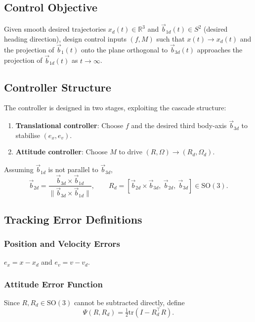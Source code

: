 \documentclass[11pt]{article}
\theoremstyle{remark}
\newcommand{\SO}{\mathrm{SO}(3)}
\newcommand{\R}{\mathbb{R}}
\newcommand{\tr}{\mathrm{tr}}
\begin{document}
\subsection{Control Objective}
Given smooth desired trajectories $x_d(t) \in \R^3$ and $\vec{b}_{1d}(t) \in S^2$ (desired heading direction), design control inputs $(f, M)$ such that $x(t) \to x_d(t)$ and the projection of $\vec{b}_1(t)$ onto the plane orthogonal to $\vec{b}_{3d}(t)$ approaches the projection of $\vec{b}_{1d}(t)$ as $t \to \infty$.

\subsection{Controller Structure}
The controller is designed in two stages, exploiting the cascade structure:
\begin{enumerate}
    \item \textbf{Translational controller}: Choose $f$ and the desired third body-axis $\vec{b}_{3d}$ to stabilise $(e_x, e_v)$.
    \item \textbf{Attitude controller}: Choose $M$ to drive $(R, \Omega) \to (R_d, \Omega_d)$.
\end{enumerate}
Assuming $\vec{b}_{1d}$ is not parallel to $\vec{b}_{3d}$,
\[
    \vec{b}_{2d} = \frac{\vec{b}_{3d} \times \vec{b}_{1d}}{\|\vec{b}_{3d} \times \vec{b}_{1d}\|}, \qquad
    R_d = [\vec{b}_{2d} \times \vec{b}_{3d},\ \vec{b}_{2d},\ \vec{b}_{3d}] \in \SO.
\]

\subsection{Tracking Error Definitions}

\subsubsection{Position and Velocity Errors}
$e_x = x - x_d$ and $e_v = v - v_d$.

\subsubsection{Attitude Error Function}
Since $R, R_d \in \SO$ cannot be subtracted directly, define
\begin{equation}
    \Psi(R, R_d) = \tfrac{1}{2}\tr\!\left(I - R_d^\top R\right).
    \label{eq:Psi}
\end{equation}
\end{document}

